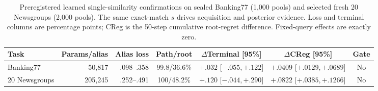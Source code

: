 \begin{table}[H]
\centering
\caption{Preregistered learned single-similarity confirmations on sealed Banking77 (1,000 pools) and selected fresh 20 Newsgroups (2,000 pools). The same exact-match $s$ drives acquisition and posterior evidence. Loss and terminal columns are percentage points; CReg is the 50-step cumulative root-regret difference. Fixed-query effects are exactly zero.}
\label{tab:step93-source-faithful}
\scriptsize
\setlength{\tabcolsep}{3pt}
\begin{tabularx}{\linewidth}{@{}l r r c c c c@{}}
\toprule
Task & Params/alias & Alias loss & Path/root & $\Delta$Terminal [95\%] & $\Delta$CReg [95\%] & Gate \\
\midrule
Banking77 & 50,817 & .098--.358 & 99.8/36.6\% & $+.032$ [$-.055,+.122$] & $+.0409$ [$+.0129,+.0689$] & No \\
20 Newsgroups & 205,245 & .252--.491 & 100/48.2\% & $+.120$ [$-.044,+.290$] & $+.0822$ [$+.0385,+.1266$] & No \\
\bottomrule
\end{tabularx}
\end{table}
